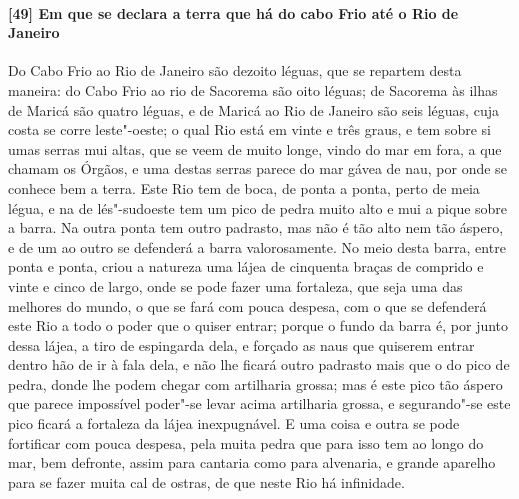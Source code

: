\paragraph{[49] Em que se declara a terra que há do cabo Frio até o Rio de Janeiro} \quad
Do Cabo Frio ao Rio de Janeiro são dezoito léguas, que se repartem desta maneira: do Cabo
Frio ao rio de Sacorema são oito léguas; de Sacorema às ilhas de Maricá são quatro léguas,
e de Maricá ao Rio de Janeiro são seis léguas, cuja costa se corre leste"-oeste; o qual Rio
está em vinte e três graus, e tem sobre si umas serras mui altas, que se veem de muito
longe, vindo do mar em fora, a que chamam os Órgãos, e uma destas serras parece do mar
gávea de nau, por onde se conhece bem a terra. Este Rio tem de boca, de ponta a ponta,
perto de meia légua, e na de lés"-sudoeste tem um pico de pedra muito alto e mui a pique
sobre a barra. Na outra ponta tem outro padrasto, mas não é tão alto nem tão áspero, e de
um ao outro se defenderá a barra valorosamente. No meio desta barra, entre ponta e ponta,
criou a natureza uma lájea de cinquenta braças de comprido e vinte e cinco de largo, onde
se pode fazer uma fortaleza, que seja uma das melhores do mundo, o que se fará com pouca
despesa, com o que se defenderá este Rio a todo o poder que o quiser entrar; porque o
fundo da barra é, por junto dessa lájea, a tiro de espingarda dela, e forçado as naus que
quiserem entrar dentro hão de ir à fala dela, e não lhe ficará outro padrasto mais que o
do pico de pedra, donde lhe podem chegar com artilharia grossa; mas é este pico tão áspero
que parece impossível poder"-se levar acima artilharia grossa, e segurando"-se este pico
ficará a fortaleza da lájea inexpugnável. E uma coisa e outra se pode fortificar com pouca
despesa, pela muita pedra que para isso tem ao longo do mar, bem defronte, assim para
cantaria como para alvenaria, e grande aparelho para se fazer muita cal de ostras, de que
neste Rio há infinidade.

